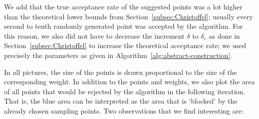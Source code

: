 \documentclass[a4paper,11pt]{article}
\renewcommand{\(}{\left (}
\renewcommand{\)}{\right )}
\newcommand{\<}{\langle}
\renewcommand{\>}{\rangle}
\newcommand{\eps}{\varepsilon}
\theoremstyle{definition}
\begin{document}
We add that the true acceptance rate of the suggested points was a lot higher than the theoretical lower bounds from Section~\ref{subsec:Christoffel}; 
usually every second to tenth randomly generated point was accepted by the algorithm. 
For this reason, we also did not have to decrease the increment $\delta$ to $\delta_\eps$
as done in Section~\ref{subsec:Christoffel}
to increase the theoretical acceptance rate;
we used precisely the parameters as given in Algorithm~\ref{alg:abstract-construction}.

In all pictures, the size of the points is drawn proportional to the size of the corresponding weight. 
In addition to the points and weights,
we also plot the area of all points that would be rejected by the algorithm
in the following iteration.
That is, the blue area can be interpreted as the area 
that is `blocked' by the already chosen sampling points.
Two observations that we find interesting are:
\end{document}
